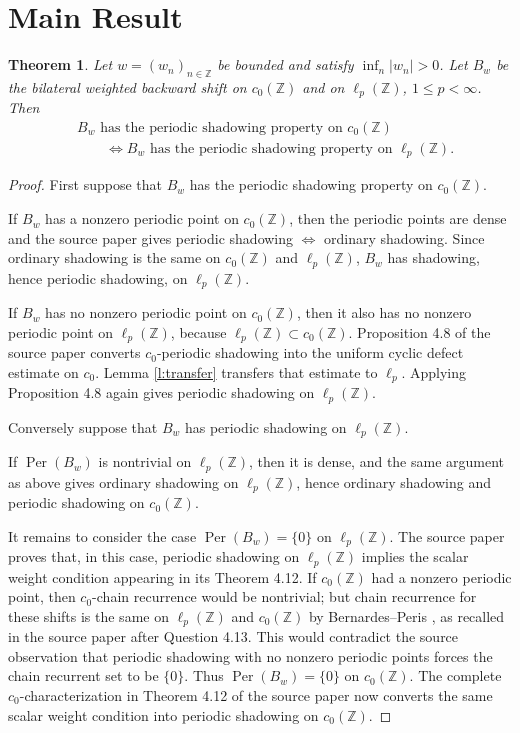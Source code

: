\documentclass[11pt]{amsart}
\newtheorem{theorem}{Theorem}
\theoremstyle{remark}
\newcommand{\Z}{\mathbb Z}
\newcommand{\abs}[1]{\left|#1\right|}
\newcommand{\Per}{\operatorname{Per}}
\begin{document}
\section{Main Result}

\begin{theorem}\label{t:main}
Let \(w=(w_n)_{n\in\Z}\) be bounded and satisfy \(\inf_n\abs{w_n}>0\).  Let \(B_w\) be the bilateral weighted backward shift on \(c_0(\Z)\) and on \(\ell_p(\Z)\), \(1\leq p<\infty\).  Then
\begin{align*}
&B_w \text{ has the periodic shadowing property on } c_0(\Z)\\
&\qquad\iff
B_w \text{ has the periodic shadowing property on } \ell_p(\Z).
\end{align*}
\end{theorem}

\begin{proof}
First suppose that \(B_w\) has the periodic shadowing property on \(c_0(\Z)\).

If \(B_w\) has a nonzero periodic point on \(c_0(\Z)\), then the periodic points are dense and the source paper gives periodic shadowing \(\Leftrightarrow\) ordinary shadowing.  Since ordinary shadowing is the same on \(c_0(\Z)\) and \(\ell_p(\Z)\), \(B_w\) has shadowing, hence periodic shadowing, on \(\ell_p(\Z)\).

If \(B_w\) has no nonzero periodic point on \(c_0(\Z)\), then it also has no nonzero periodic point on \(\ell_p(\Z)\), because \(\ell_p(\Z)\subset c_0(\Z)\).  Proposition 4.8 of the source paper converts \(c_0\)-periodic shadowing into the uniform cyclic defect estimate on \(c_0\).  Lemma \ref{l:transfer} transfers that estimate to \(\ell_p\).  Applying Proposition 4.8 again gives periodic shadowing on \(\ell_p(\Z)\).

Conversely suppose that \(B_w\) has periodic shadowing on \(\ell_p(\Z)\).

If \(\Per(B_w)\) is nontrivial on \(\ell_p(\Z)\), then it is dense, and the same argument as above gives ordinary shadowing on \(\ell_p(\Z)\), hence ordinary shadowing and periodic shadowing on \(c_0(\Z)\).

It remains to consider the case \(\Per(B_w)=\{0\}\) on \(\ell_p(\Z)\).  The source paper proves that, in this case, periodic shadowing on \(\ell_p(\Z)\) implies the scalar weight condition appearing in its Theorem 4.12.  If \(c_0(\Z)\) had a nonzero periodic point, then \(c_0\)-chain recurrence would be nontrivial; but chain recurrence for these shifts is the same on \(\ell_p(\Z)\) and \(c_0(\Z)\) by Bernardes--Peris \cite[Theorem 14]{BP2024}, as recalled in the source paper after Question 4.13.  This would contradict the source observation that periodic shadowing with no nonzero periodic points forces the chain recurrent set to be \(\{0\}\).  Thus \(\Per(B_w)=\{0\}\) on \(c_0(\Z)\).  The complete \(c_0\)-characterization in Theorem 4.12 of the source paper now converts the same scalar weight condition into periodic shadowing on \(c_0(\Z)\).
\end{proof}
\end{document}
